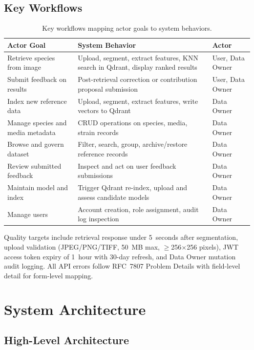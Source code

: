 \subsection{Key Workflows}\label{key-workflows}

\begin{table}[H]
\centering
\begin{tabular}{@{}p{4cm} p{6cm} p{3.5cm}@{}}
\toprule
\textbf{Actor Goal} & \textbf{System Behavior} & \textbf{Actor} \\
\midrule
Retrieve species from image & Upload, segment, extract features, KNN search in Qdrant, display ranked results & User, Data Owner \\
Submit feedback on results & Post-retrieval correction or contribution proposal submission & User, Data Owner \\
Index new reference data & Upload, segment, extract features, write vectors to Qdrant & Data Owner \\
Manage species and media metadata & CRUD operations on species, media, strain records & Data Owner \\
Browse and govern dataset & Filter, search, group, archive/restore reference records & Data Owner \\
Review submitted feedback & Inspect and act on user feedback submissions & Data Owner \\
Maintain model and index & Trigger Qdrant re-index, upload and assess candidate models & Data Owner \\
Manage users & Account creation, role assignment, audit log inspection & Data Owner \\
\bottomrule
\end{tabular}
\caption{Key workflows mapping actor goals to system behaviors.}
\end{table}

Quality targets include retrieval response under 5~seconds after segmentation, upload validation (JPEG/PNG/TIFF, 50~MB max, $\geq$256$\times$256 pixels), JWT access token expiry of 1~hour with 30-day refresh, and Data Owner mutation audit logging. All API errors follow RFC~7807 Problem Details with field-level detail for form-level mapping.

\section{System Architecture}\label{system-architecture}

\subsection{High-Level Architecture}\label{high-level-architecture}

